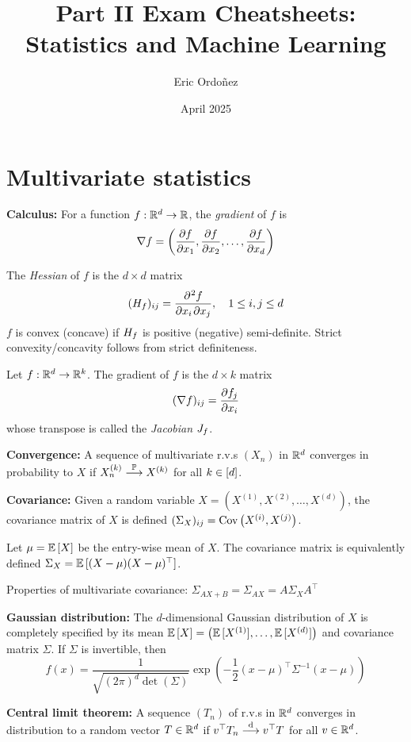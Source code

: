 \documentclass[a4paper]{article}
\title{Part II Exam Cheatsheets:\\Statistics and Machine Learning}
\author{Eric Ordo\~nez}
\date{April 2025}
\begin{document}
\maketitle

\section{Multivariate statistics}
    \textbf{Calculus:} For a function $f: \mathbb{R}^d \rightarrow \mathbb{R}$, the \emph{gradient} of $f$ is
    \[
        \grad{f} = \left(\diffp{f}{x_1}, \diffp{f}{x_2}, \dots, \diffp{f}{x_d}\right)
    \]
    
    The \emph{Hessian} of $f$ is the $d \times d$ matrix
    \[
        (\hess_f)_{ij} = \diffp{f}{x_i,x_j}, \quad 1 \leq i, j \leq d
    \]
    $f$ is convex (concave) if $H_f$ is positive (negative) semi-definite.
    Strict convexity/concavity follows from strict definiteness.

    Let $f: \mathbb{R}^d \rightarrow \mathbb{R}^k$.
    The gradient of $f$ is the $d \times k$ matrix
    \[
        (\grad{f})_{ij} = \diffp{f_j}{x_i}
    \]
    whose transpose is called the \emph{Jacobian} $J_f$.

    \textbf{Convergence:} A sequence of multivariate r.v.s $(X_n)$ in $\mathbb{R}^d$ converges in probability to $X$ if $X_n^{(k)} \overset{\operatorname{\mathbb{P}}}{\longrightarrow} X^{(k)}$ for all $k \in \left[d\right]$.

    \textbf{Covariance:} Given a random variable $X = \left(X^{(1)}, X^{(2)}, \dots, X^{(d)}\right)$, the covariance matrix of $X$ is defined $(\Sigma_X)_{ij} = \operatorname{Cov}{\left(X^{(i)}, X^{(j)}\right)}$.

    Let $\mu = \operatorname{\mathbb{E}}{[X]}$ be the entry-wise mean of $X$.
    The covariance matrix is equivalently defined $\Sigma_X = \operatorname{\mathbb{E}}{[(X - \mu)(X - \mu)^\top]}$.

    Properties of multivariate covariance: $\Sigma_{AX + B} = \Sigma_{AX} = A \Sigma_X A^\top$

    \textbf{Gaussian distribution:} The $d$-dimensional Gaussian distribution of $X$ is completely specified by its mean $\operatorname{\mathbb{E}}{[X]} = \left(\operatorname{\mathbb{E}}{[X^{(1)}]}, \dots, \operatorname{\mathbb{E}}{[X^{(d)}]}\right)$ and covariance matrix $\Sigma$.
    If $\Sigma$ is invertible, then
    \[
        f(x) = \frac{1}{\sqrt{(2\pi)^d \det{(\Sigma)}}} \exp{\left(-\frac{1}{2} (x - \mu)^\top \Sigma^{-1} (x - \mu)\right)}
    \]

    \textbf{Central limit theorem:} A sequence $(T_n)$ of r.v.s in $\mathbb{R}^d$ converges in distribution to a random vector $T \in \mathbb{R}^d$ if $v^\top T_n \overset{\mathrm{d}}{\longrightarrow} v^\top T$ for all $v \in \mathbb{R}^d$.
\end{document}
